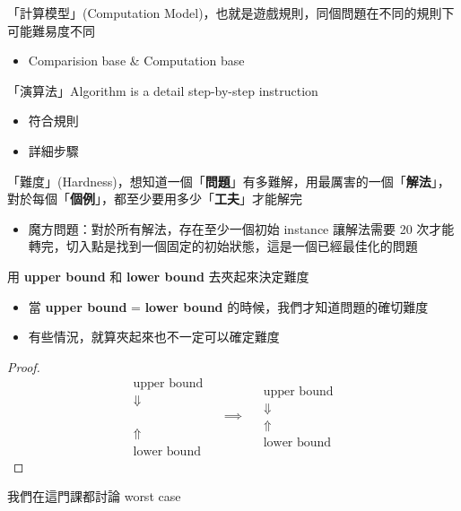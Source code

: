 \begin{definition}
    「計算模型」(Computation Model)，也就是遊戲規則，同個問題在不同的規則下可能難易度不同

    \begin{itemize}
        \item Comparision base \& Computation base
    \end{itemize}
    
\end{definition}

\begin{definition}[Algorithm]
    「演算法」Algorithm is a detail step-by-step instruction
    \begin{itemize}
        \item 符合規則
        \item 詳細步驟
    \end{itemize}
\end{definition}

\begin{definition}[Hardness]
    「難度」(Hardness)，想知道一個「\textbf{問題}」有多難解，用最厲害的一個「\textbf{解法}」，對於每個「\textbf{個例}」，都至少要用多少「\textbf{工夫}」才能解完
\end{definition}

\begin{itemize}
    \item 魔方問題：對於所有解法，存在至少一個初始 instance 讓解法需要 20 次才能轉完，切入點是找到一個固定的初始狀態，這是一個已經最佳化的問題
\end{itemize}

\begin{theorem}
    用 \textbf{upper bound} 和 \textbf{lower bound} 去夾起來決定難度
    \begin{itemize}
        \item 當 \textbf{upper bound} = \textbf{lower bound} 的時候，我們才知道問題的確切難度
        \item 有些情況，就算夾起來也不一定可以確定難度
    \end{itemize}
\end{theorem}
\begin{proof}
    \[
    \begin{matrix}
        \boxed{\text{upper bound}}\\
        \Downarrow \\
        \\
        \\
        \\
        \Uparrow \\
        \boxed{\text{lower bound}}
    \end{matrix}\quad\implies\quad
    \begin{matrix}
        \boxed{\text{upper bound}}\\
        \Downarrow\\
        \Uparrow \\
        \boxed{\text{lower bound}}
    \end{matrix}
    \]
\end{proof}

\begin{note}
    我們在這門課都討論 worst case
\end{note}